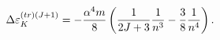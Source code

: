 \begin{equation}
\Delta \varepsilon _{K}^{(tr)(J+1)}=-\frac{\alpha ^{4}m}{8}\left( \frac{1}{%
2J+3}\frac{1}{n^{3}}-\frac{3}{8}\frac{1}{n^{4}}\right) .
\end{equation}

